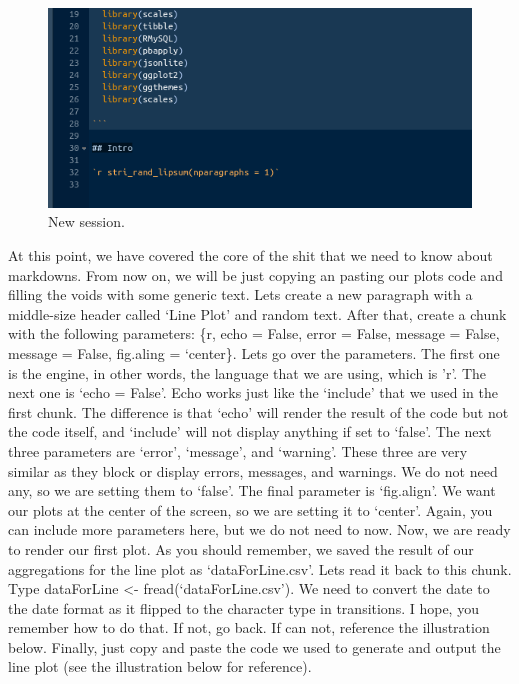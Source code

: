 \documentclass[]{book}
\begin{document}
\begin{figure}
\centering
\includegraphics{markdown5.png}
\caption{New session.}
\end{figure}

At this point, we have covered the core of the shit that we need to know about markdowns. From now on, we will be just copying an pasting our plots code and filling the voids with some generic text. Lets create a new paragraph with a middle-size header called `Line Plot' and random text. After that, create a chunk with the following parameters: \{r, echo = False, error = False, message = False, message = False, fig.aling = `center\}.
Lets go over the parameters. The first one is the engine, in other words, the language that we are using, which is 'r'. The next one is `echo = False'. Echo works just like the `include' that we used in the first chunk. The difference is that `echo' will render the result of the code but not the code itself, and `include' will not display anything if set to `false'. The next three parameters are `error', `message', and `warning'. These three are very similar as they block or display errors, messages, and warnings. We do not need any, so we are setting them to `false'. The final parameter is `fig.align'. We want our plots at the center of the screen, so we are setting it to `center'. Again, you can include more parameters here, but we do not need to now. Now, we are ready to render our first plot. As you should remember, we saved the result of our aggregations for the line plot as `dataForLine.csv'. Lets read it back to this chunk. Type dataForLine \textless{}- fread(`dataForLine.csv'). We need to convert the date to the date format as it flipped to the character type in transitions. I hope, you remember how to do that. If not, go back. If can not, reference the illustration below. Finally, just copy and paste the code we used to generate and output the line plot (see the illustration below for reference).
\end{document}
